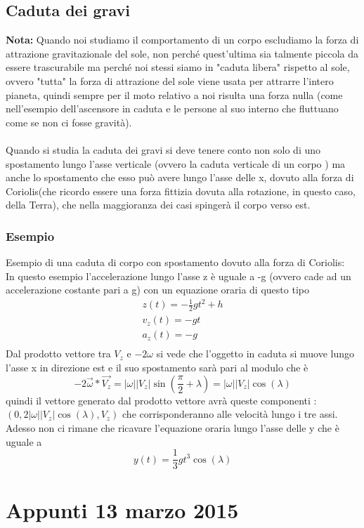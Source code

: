 \documentclass[portrait]{article}
\begin{document}
\subsection{Caduta dei gravi}
\textbf{Nota:} Quando noi studiamo il comportamento di un corpo escludiamo la forza di attrazione gravitazionale del sole, non perché quest'ultima sia talmente piccola da essere trascurabile ma perché noi stessi siamo in "caduta libera" rispetto al sole, ovvero "tutta" la forza di attrazione del sole viene usata per attrarre l'intero pianeta, quindi sempre per il moto relativo a noi risulta una forza nulla (come nell'esempio dell'ascensore in caduta e le persone al suo interno che fluttuano come se non ci fosse gravità). \\ \\
Quando si studia la caduta dei gravi si deve tenere conto non solo di uno spostamento lungo l'asse verticale (ovvero la caduta verticale di un corpo ) ma anche lo spostamento che esso può avere lungo l'asse delle x, dovuto alla forza di Coriolis(che ricordo essere una forza fittizia dovuta alla rotazione, in questo caso, della Terra), che nella maggioranza dei casi spingerà il corpo verso est.
\subsubsection{Esempio}
Esempio di una caduta di corpo con spostamento dovuto alla forza di Coriolis: \\ 
In questo esempio l'accelerazione lungo l'asse z è uguale a -g (ovvero cade ad un accelerazione costante pari a g) con un equazione oraria di questo tipo
\[ \begin{array}{lr}
z(t) = -\frac{1}{2}gt^2 + h \\
v_z(t) = -gt \\
a_z(t) = -g \\
\end{array}
\]
Dal prodotto vettore tra $V_z$ e $-2\omega$ si vede che l'oggetto in caduta si muove lungo l'asse x in direzione est e il suo spostamento sarà pari al modulo che è 
$$-2\overrightarrow{\omega}*\overrightarrow{V_z} = |\omega||V_z|\sin(\frac{\pi}{2} + \lambda) = |\omega||V_z|\cos(\lambda)$$
quindi il vettore generato dal prodotto vettore avrà queste componenti : $(0,2|\omega||V_z|\cos(\lambda),V_z)$ che corrisponderanno alle velocità lungo i tre assi.
Adesso non ci rimane che ricavare l'equazione oraria lungo l'asse delle y che è uguale a 
$$y(t) = \frac{1}{3}gt^3\cos(\lambda)$$
\section{Appunti 13 marzo 2015}
\end{document}
